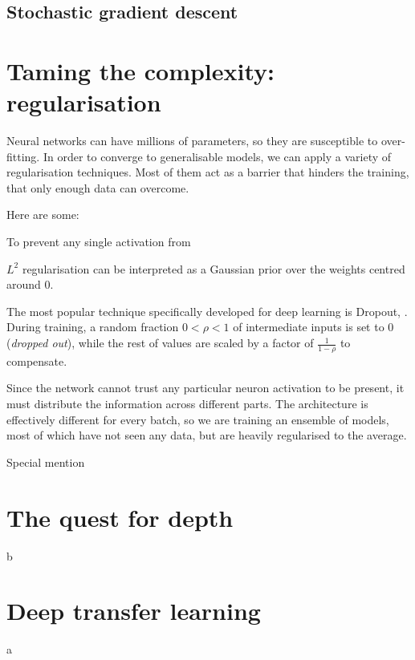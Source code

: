 \subsection{Stochastic gradient descent}

\section{Taming the complexity: regularisation}
Neural networks can have millions of parameters, so they are susceptible to over-fitting.
In order to converge to generalisable models, we can apply a variety of regularisation techniques.
Most of them act as a barrier that hinders the training, that only enough data can overcome.


Here are some:


To prevent any single activation from 

$L^2$ regularisation can be interpreted as a Gaussian prior over the weights centred around $0$.

The most popular technique  
specifically developed for deep learning is Dropout, \citep{dropout}. 
During training, a random fraction $0 < \rho < 1$ of intermediate inputs is set to $0$ (\emph{dropped out}), while the rest of values are scaled by a factor of $\frac{1}{1-\rho}$ to compensate.

Since the network cannot trust any particular neuron activation to be present, it must distribute the information across different parts.
The architecture is effectively different for every batch, so we are training an ensemble of models, most of which have not seen any data, but are heavily regularised to the average.



Special mention



\section{The quest for depth}
b
\section{Deep transfer learning}
a


